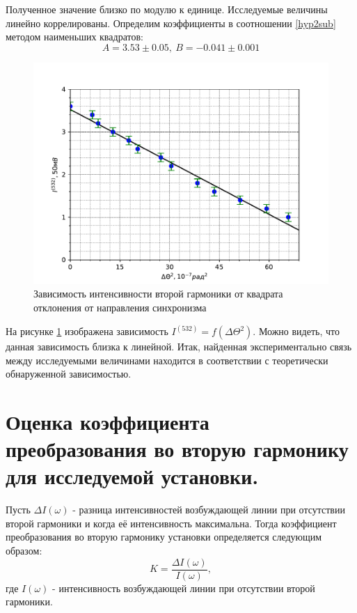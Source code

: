 \documentclass[12pt]{article}
\begin{document}
Полученное значение близко по модулю к единице. Исследуемые величины линейно коррелированы. Определим коэффициенты в соотношении \ref{hyp2sub} методом наименьших квадратов:
\begin{equation}
A = 3.53\pm 0.05,\ B = -0.041\pm 0.001
\end{equation}

\begin{figure}[h!]
  \begin{center}
    \includegraphics[width=\textwidth]{pic4.pdf}
  \end{center}
  \caption{Зависимость интенсивности второй гармоники от квадрата отклонения от направления синхронизма}
  \label{pic4}
\end{figure}

На рисунке \ref{pic4} изображена зависимость $I^{(532)}=f(\Delta \Theta ^2)$. Можно видеть, что данная зависимость близка к линейной. Итак, найденная экспериментально связь между исследуемыми величинами находится в соответствии с теоретически обнаруженной зависимостью.

\section{Оценка коэффициента преобразования во вторую гармонику для исследуемой установки.}

\hspace{0.5cm}
Пусть $\Delta I(\omega)$ - разница интенсивностей возбуждающей линии при отсутствии второй гармоники и когда её интенсивность максимальна. Тогда коэффициент преобразования во вторую гармонику установки определяется следующим образом:
\begin{equation}
K = \frac{\Delta I(\omega)}{I(\omega)},
\end{equation}
где $I(\omega)$ - интенсивность возбуждающей линии при отсутствии второй гармоники.
\end{document}
